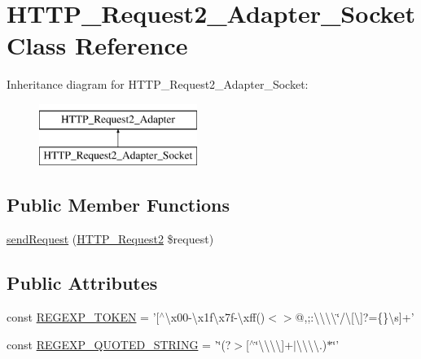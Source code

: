 \hypertarget{classHTTP__Request2__Adapter__Socket}{\section{H\-T\-T\-P\-\_\-\-Request2\-\_\-\-Adapter\-\_\-\-Socket Class Reference}
\label{classHTTP__Request2__Adapter__Socket}
}
Inheritance diagram for H\-T\-T\-P\-\_\-\-Request2\-\_\-\-Adapter\-\_\-\-Socket\-:\begin{figure}[H]
\begin{center}
\leavevmode
\includegraphics[height=2.000000cm]{classHTTP__Request2__Adapter__Socket}
\end{center}
\end{figure}
\subsection*{Public Member Functions}
\begin{DoxyCompactItemize}
\item 
\hyperlink{classHTTP__Request2__Adapter__Socket_ac601f7f165d0771e38f680a1f159fe79}{send\-Request} (\hyperlink{classHTTP__Request2}{H\-T\-T\-P\-\_\-\-Request2} \$request)
\end{DoxyCompactItemize}
\subsection*{Public Attributes}
\begin{DoxyCompactItemize}
\item 
const \hyperlink{classHTTP__Request2__Adapter__Socket_a56beacc9218c6048c7f9ad5af80959eb}{R\-E\-G\-E\-X\-P\-\_\-\-T\-O\-K\-E\-N} = '\mbox{[}$^\wedge$\textbackslash{}x00-\/\textbackslash{}x1f\textbackslash{}x7f-\/\textbackslash{}xff()$<$$>$@,;\-:\textbackslash{}\textbackslash{}\textbackslash{}\textbackslash{}\char`\"{}/\textbackslash{}\mbox{[}\textbackslash{}\mbox{]}?=\{\}\textbackslash{}s\mbox{]}+'
\item 
const \hyperlink{classHTTP__Request2__Adapter__Socket_a6c107bbe3366105b84ab79ccedda35c9}{R\-E\-G\-E\-X\-P\-\_\-\-Q\-U\-O\-T\-E\-D\-\_\-\-S\-T\-R\-I\-N\-G} = '\char`\"{}(?$>$\mbox{[}$^\wedge$\char`\"{}\textbackslash{}\textbackslash{}\textbackslash{}\textbackslash{}\mbox{]}+$|$\textbackslash{}\textbackslash{}\textbackslash{}\textbackslash{}.)$\ast$\char`\"{}'
\end{DoxyCompactItemize}
